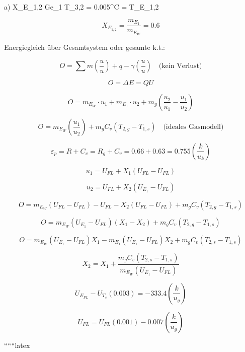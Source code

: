 a) \quad X_{E_{1,2}} \quad Ge_{1} \quad T_{3,2} = 0.005^\circ C = T_{E_{1,2}}

\[
X_{E_{1,2}} = \frac{m_{E_{1}}}{m_{E_{W}}} = 0.6
\]

Energiegleich über Gesamtsystem oder gesamte k.t.:

\[
O = \sum m \left( \frac{u}{u} \right) + q - \gamma \left( \frac{u}{u} \right) \quad \text{(kein Verlust)}
\]

\[
O = \Delta E = Q U
\]

\[
O = m_{E_{W}} \cdot u_{1} + m_{E_{1}} \cdot u_{2} + m_{g} \left( \frac{u_{2}}{u_{1}} - \frac{u_{1}}{u_{2}} \right)
\]

\[
O = m_{E_{W}} \left( \frac{u_{1}}{u_{2}} \right) + m_{g} C_{v} \left( T_{2,g} - T_{1,s} \right) \quad \text{(ideales Gasmodell)}
\]

\[
\varepsilon_{p} = R + C_{v} = R_{g} + C_{v} = 0.66 + 0.63 = 0.755 \left( \frac{k}{u_{k}} \right)
\]

\[
u_{1} = U_{FL} + X_{1} \left( U_{FL} - U_{FL} \right)
\]

\[
u_{2} = U_{FL} + X_{2} \left( U_{E_{1}} - U_{FL} \right)
\]

\[
O = m_{E_{W}} \left( U_{FL} - U_{FL} \right) - U_{FL} - X_{2} \left( U_{FL} - U_{FL} \right) + m_{g} C_{v} \left( T_{2,g} - T_{1,s} \right)
\]

\[
O = m_{E_{W}} \left( U_{E_{1}} - U_{FL} \right) \left( X_{1} - X_{2} \right) + m_{g} C_{v} \left( T_{2,g} - T_{1,s} \right)
\]

\[
O = m_{E_{W}} \left( U_{E_{1}} - U_{FL} \right) X_{1} - m_{E_{1}} \left( U_{E_{1}} - U_{FL} \right) X_{2} + m_{g} C_{v} \left( T_{2,s} - T_{1,s} \right)
\]

\[
X_{2} = X_{1} + \frac{m_{g} C_{v} \left( T_{2,s} - T_{1,s} \right)}{m_{E_{W}} \left( U_{E_{1}} - U_{FL} \right)}
\]

\[
U_{E_{FL}} - U_{T_{s}} \left( 0.003 \right) = -333.4 \left( \frac{k}{u_{g}} \right)
\]

\[
U_{FL} = U_{FL} \left( 0.001 \right) - 0.007 \left( \frac{k}{u_{g}} \right)
\]

``````latex